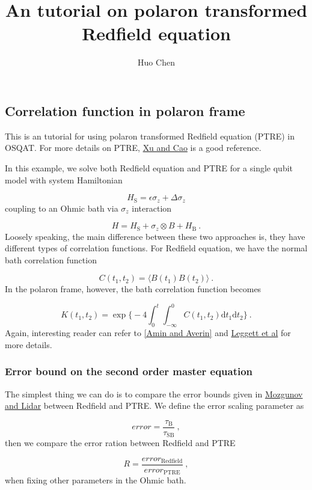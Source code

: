 \documentclass[12pt,a4paper]{article}
\title{ An tutorial on polaron transformed Redfield equation }
\author{ Huo Chen }
\begin{document}
\maketitle

\subsection{Correlation function in polaron frame}
This is an tutorial for using polaron transformed Redfield equation (PTRE) in OSQAT. For more details on PTRE, \href{https://link.springer.com/article/10.1007%2Fs11467-016-0540-2}{Xu and Cao} is a good reference.

In this example, we solve both Redfield equation and PTRE for a single qubit model with system Hamiltonian

\[
H_\mathrm{S}=\epsilon \sigma_z + \Delta \sigma_z
\]
coupling to an Ohmic bath via $\sigma_z$ interaction

\[
H = H_\mathrm{S} + \sigma_z \otimes B + H_\mathrm{B}\ .
\]
Loosely speaking, the main difference between these two approaches is, they have different types of correlation functions. For Redfield equation, we have the normal bath correlation function

\[
C(t_1, t_2) = \langle B(t_1)B(t_2) \rangle \ .
\]
In the polaron frame, however, the bath correlation function becomes

\[
K(t_1, t_2) = \exp\Big\{ -4 \int_0^t \int_{-\infty}^{0}C(t_1, t_2) \mathrm{d}t_1 \mathrm{d}t_2 \Big\} \ .
\]
Again, interesting reader can refer to \href{https://link.aps.org/doi/10.1103/PhysRevLett.100.197001}{[Amin and Averin]} and \href{https://link.aps.org/doi/10.1103/RevModPhys.59.1}{Leggett et al} for more details.

\subsubsection{Error bound on the second order master equation}
The simplest thing we can do is to compare the error bounds given in \href{https://quantum-journal.org/papers/q-2020-02-06-227/}{Mozgunov and Lidar} between Redfield and PTRE. We define the error scaling parameter as

\[
error = \frac{\tau_\mathrm{B}}{\tau_\mathrm{SB}} \ ,
\]
then we compare the error ration between Redfield and PTRE

\[
R = \frac{error_{\mathrm{Redfield}}}{error_{\mathrm{PTRE}}} \ ,
\]
when fixing other parameters in the Ohmic bath.
\end{document}
